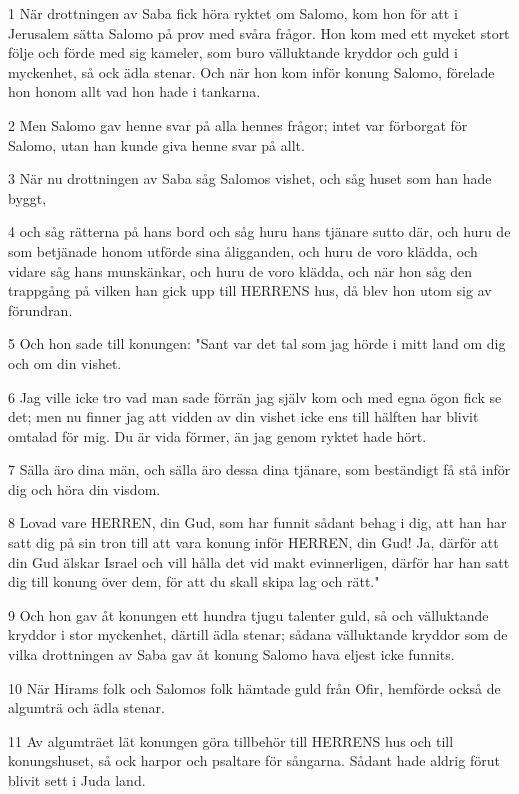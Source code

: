 \par 1 När drottningen av Saba fick höra ryktet om Salomo, kom hon för att i Jerusalem sätta Salomo på prov med svåra frågor. Hon kom med ett mycket stort följe och förde med sig kameler, som buro välluktande kryddor och guld i myckenhet, så ock ädla stenar. Och när hon kom inför konung Salomo, förelade hon honom allt vad hon hade i tankarna.
\par 2 Men Salomo gav henne svar på alla hennes frågor; intet var förborgat för Salomo, utan han kunde giva henne svar på allt.
\par 3 När nu drottningen av Saba såg Salomos vishet, och såg huset som han hade byggt,
\par 4 och såg rätterna på hans bord och såg huru hans tjänare sutto där, och huru de som betjänade honom utförde sina åligganden, och huru de voro klädda, och vidare såg hans munskänkar, och huru de voro klädda, och när hon såg den trappgång på vilken han gick upp till HERRENS hus, då blev hon utom sig av förundran.
\par 5 Och hon sade till konungen: "Sant var det tal som jag hörde i mitt land om dig och om din vishet.
\par 6 Jag ville icke tro vad man sade förrän jag själv kom och med egna ögon fick se det; men nu finner jag att vidden av din vishet icke ens till hälften har blivit omtalad för mig. Du är vida förmer, än jag genom ryktet hade hört.
\par 7 Sälla äro dina män, och sälla äro dessa dina tjänare, som beständigt få stå inför dig och höra din visdom.
\par 8 Lovad vare HERREN, din Gud, som har funnit sådant behag i dig, att han har satt dig på sin tron till att vara konung inför HERREN, din Gud! Ja, därför att din Gud älskar Israel och vill hålla det vid makt evinnerligen, därför har han satt dig till konung över dem, för att du skall skipa lag och rätt."
\par 9 Och hon gav åt konungen ett hundra tjugu talenter guld, så och välluktande kryddor i stor myckenhet, därtill ädla stenar; sådana välluktande kryddor som de vilka drottningen av Saba gav åt konung Salomo hava eljest icke funnits.
\par 10 När Hirams folk och Salomos folk hämtade guld från Ofir, hemförde också de algumträ och ädla stenar.
\par 11 Av algumträet lät konungen göra tillbehör till HERRENS hus och till konungshuset, så ock harpor och psaltare för sångarna. Sådant hade aldrig förut blivit sett i Juda land.
